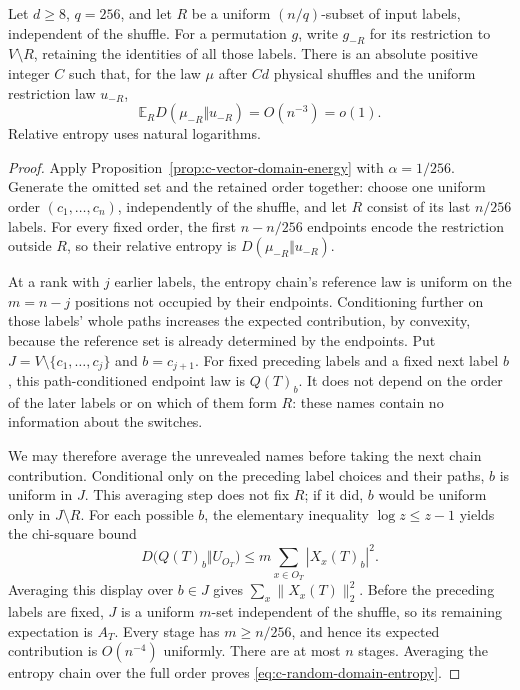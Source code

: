 \begin{theorem}
\label{thm:c-random-domain-entropy}
Let $d\ge8$, $q=256$, and let $R$ be a uniform $(n/q)$-subset of
input labels, independent of the shuffle.  For a permutation $g$, write
$g_{-R}$ for its restriction to $V\setminus R$, retaining the identities
of all those labels.  There is an absolute positive integer $C$ such
that, for the law $\mu$ after $Cd$ physical shuffles and the uniform
restriction law $u_{-R}$,
\begin{equation}
 \mathbb E_R D(\mu_{-R}\Vert u_{-R})=O(n^{-3})=o(1).
 \label{eq:c-random-domain-entropy}
\end{equation}
Relative entropy uses natural logarithms.
\end{theorem}

\begin{proof}
Apply Proposition~\ref{prop:c-vector-domain-energy} with
$\alpha=1/256$. Generate the omitted set and the retained order
together: choose one uniform order $(c_1,\ldots,c_n)$, independently
of the shuffle, and let $R$ consist of its last $n/256$ labels.
For every fixed order, the first $n-n/256$ endpoints encode the
restriction outside $R$, so their relative entropy is
$D(\mu_{-R}\Vert u_{-R})$.

At a rank with $j$ earlier labels, the entropy chain's reference law
is uniform on the $m=n-j$ positions not occupied by their endpoints.
Conditioning further on those labels' whole paths increases the
expected contribution, by convexity, because the reference set is
already determined by the endpoints. Put
$J=V\setminus\{c_1,\ldots,c_j\}$ and $b=c_{j+1}$.
For fixed preceding labels and a fixed next label $b$, this
path-conditioned endpoint law is $Q(T)_b$. It does not depend on
the order of the later labels or on which of them form $R$: these
names contain no information about the switches.

We may therefore average the unrevealed names before taking the
next chain contribution. Conditional only on the preceding label
choices and their paths, $b$ is uniform in $J$. This averaging step
does not fix $R$; if it did, $b$ would be uniform only in $J\setminus R$.
For each possible $b$, the elementary inequality
$\log z\le z-1$ yields the chi-square bound
\[
 D\bigl(Q(T)_b\Vert U_{O_T}\bigr)
 \le m\sum_{x\in O_T}|X_x(T)_b|^2.
\]
Averaging this display over $b\in J$ gives
$\sum_x\|X_x(T)\|_2^2$. Before the preceding labels are fixed,
$J$ is a uniform $m$-set independent of the shuffle, so its remaining
expectation is $A_T$. Every stage has $m\ge n/256$, and hence its
expected contribution is $O(n^{-4})$ uniformly. There are at most
$n$ stages. Averaging the entropy chain over the full order proves
\eqref{eq:c-random-domain-entropy}.
\end{proof}

